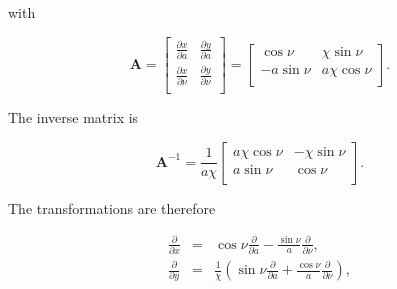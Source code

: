 \documentclass[apj]{emulateapj}
\newcommand{\pderiv}[2]{\frac{\partial #1}{\partial #2}}
\newcommand{\pderivn}[3]{\frac{\partial^{#3} #1}{\partial #2^{#3}}}
\newcommand{\vt}[1]{\mathbf{#1}}       %
\newcommand{\beq}{\begin{equation}}
\newcommand{\eeq}{\end{equation}}
\newcommand{\beqn}{\begin{eqnarray}}
\newcommand{\eeqn}{\end{eqnarray}}
\begin{document}
\noindent with 

\beq
\vt{A} = \left[\begin{array}{cc}
\pderiv{x}{a}  & \pderiv{y}{a}  \\
\pderiv{x}{\nu}  & \pderiv{y}{\nu} \\
\end{array}\right] = \left[\begin{array}{cc}
\cos\nu  & \chi\sin\nu  \\
-a\sin\nu  & a\chi\cos\nu \\
\end{array}\right]. 
\eeq

\noindent The inverse matrix is 

\beq
\vt{A}^{-1} = \frac{1}{a\chi} \left[\begin{array}{cc}
a\chi\cos\nu  & -\chi\sin\nu  \\
a\sin\nu  & \cos\nu \\
\end{array}\right].  
\eeq

The transformations are therefore

\beqn
\pderiv{}{x} &=& \cos\nu \pderiv{}{a} - \frac{\sin\nu}{a} \pderiv{}{\nu}, \\
\pderiv{}{y} &=& \frac{1}{\chi}\left(\sin\nu \pderiv{}{a} + \frac{\cos\nu}{a} \pderiv{}{\nu} \right),
\eeqn



\end{document}
